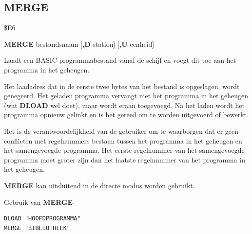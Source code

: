 \subsection{MERGE}
\begin{description}[leftmargin=2cm,style=nextline]
\item [Token:]    \$E6

\item [Formaat:]   {\bf MERGE} bestandsnaam [{\bf,D} station] [{\bf,U} eenheid]

\item [Gebruik:]    Laadt een BASIC-programmabestand vanaf de schijf en voegt dit toe aan het programma in het geheugen.

                  \filenamedefinition

                  \drivedefinition

                  \unitdefinition

\item [Opmerkingen:]  Het laadadres dat in de eerste twee bytes van het bestand is opgeslagen, wordt genegeerd. Het geladen programma vervangt niet het programma in het geheugen (wat {\bf DLOAD} wel doet), maar wordt eraan toegevoegd. Na het laden wordt het programma opnieuw gelinkt en is het gereed om te worden uitgevoerd of bewerkt.

                  Het is de verantwoordelijkheid van de gebruiker om te waarborgen dat er geen conflicten met regelnummers bestaan tussen het programma in het geheugen en het samengevoegde programma. Het eerste regelnummer van het samengevoegde programma moet groter zijn dan het laatste regelnummer van het programma in het geheugen.

                  {\bf MERGE} kan uitsluitend in de directe modus worden gebruikt.

\item [Voorbeeld:]  Gebruik van {\bf MERGE}

\begin{tcolorbox}[colback=black,coltext=white]
\verbatimfont{\codefont}
\begin{verbatim}
DLOAD "HOOFDPROGRAMMA"
MERGE "BIBLIOTHEEK"
\end{verbatim}
\end{tcolorbox}
\end{description}


\newpage
